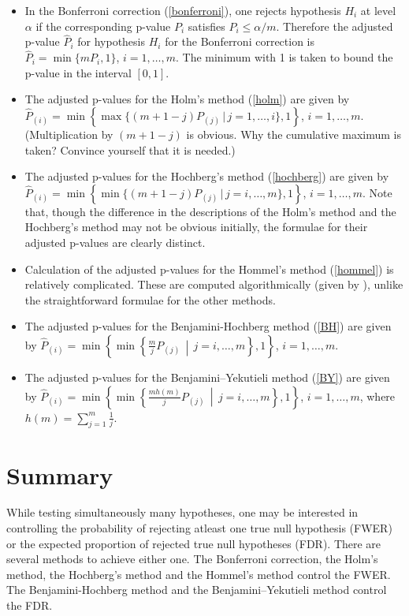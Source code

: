 \documentclass[
]{book}
\begin{document}
\begin{itemize}
\item
  In the Bonferroni correction (\ref{bonferroni}), one rejects hypothesis \(H_i\) at level \(\alpha\) if the corresponding p-value \(P_i\) satisfies \(P_i \le \alpha / m\). Therefore the adjusted p-value \(\hat{P}_i\) for hypothesis \(H_i\) for the Bonferroni correction is \(\hat{P}_i = \min\{ m P_i, 1 \}\), \(i = 1, \ldots, m\). The minimum with 1 is taken to bound the p-value in the interval \([0, 1]\).
\item
  The adjusted p-values for the Holm's method (\ref{holm}) are given by \(\hat{P}_{(i)} = \min\left\{ \max\{ (m + 1 - j) P_{(j)} \,|\, j = 1, \ldots, i \}, 1 \right\}\), \(i = 1, \ldots, m\). (Multiplication by \((m + 1 - j)\) is obvious. Why the cumulative maximum is taken? Convince yourself that it is needed.)
\item
  The adjusted p-values for the Hochberg's method (\ref{hochberg}) are given by \(\hat{P}_{(i)} = \min\left\{ \min\{ (m + 1 - j) P_{(j)} \,|\, j = i, \ldots, m \}, 1 \right\}\), \(i = 1, \ldots, m\). Note that, though the difference in the descriptions of the Holm's method and the Hochberg's method may not be obvious initially, the formulae for their adjusted p-values are clearly distinct.
\item
  Calculation of the adjusted p-values for the Hommel's method (\ref{hommel}) is relatively complicated. These are computed algorithmically (given by \citet{wright1992adjusted}), unlike the straightforward formulae for the other methods.
\item
  The adjusted p-values for the Benjamini-Hochberg method (\ref{BH}) are given by \(\hat{P}_{(i)} = \min\left\{ \min\left\{ \frac{m}{j} P_{(j)} \,\middle|\, j = i, \ldots, m \right\}, 1 \right\}\), \(i = 1, \ldots, m\).
\item
  The adjusted p-values for the Benjamini--Yekutieli method (\ref{BY}) are given by \(\hat{P}_{(i)} = \min\left\{ \min\left\{ \frac{m h(m)}{j} P_{(j)} \,\middle|\, j = i, \ldots, m \right\}, 1 \right\}\), \(i = 1, \ldots, m\), where \(h(m) = \sum_{j=1}^m \frac{1}{j}\).
\end{itemize}

\hypertarget{multipletesting-summary}{%
\section{Summary}\label{multipletesting-summary}}

While testing simultaneously many hypotheses, one may be interested in controlling the probability of rejecting atleast one true null hypothesis (FWER) or the expected proportion of rejected true null hypotheses (FDR). There are several methods to achieve either one. The Bonferroni correction, the Holm's method, the Hochberg's method and the Hommel's method control the FWER. The Benjamini-Hochberg method and the Benjamini--Yekutieli method control the FDR.
\end{document}
